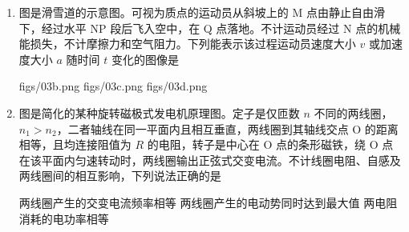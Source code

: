 \documentclass[\gkver]{gaokaozhenti}
\begin{document}
\begin{enumerate}
{B．根据 $\omega = \frac{2\pi}{T}$ 可知火星公转的角速度小于地球公转的角速度，故 B 错误；

D．根据 $G\frac{Mm}{r^{2}} = ma$ 可得 $a = \frac{GM}{r^{2}}$，可知火星公转的加速度小于地球公转的加速度，故 D 正确。

故选 D。
}

\item
图是滑雪道的示意图。可视为质点的运动员从斜坡上的 M 点由静止自由滑下，经过水平 NP 段后飞入空中，在 Q 点落地。不计运动员经过 N 点的机械能损失，不计摩擦力和空气阻力。下列能表示该过程运动员速度大小 $v$ 或加速度大小 $a$ 随时间 $t$ 变化的图像是


{figs/03b.png}
{figs/03c.png}
{figs/03d.png}


\item
图是简化的某种旋转磁极式发电机原理图。定子是仅匝数 $n$ 不同的两线圈，$n_{1} > n_{2}$，二者轴线在同一平面内且相互垂直，两线圈到其轴线交点 O 的距离相等，且均连接阻值为 $R$ 的电阻，转子是中心在 O 点的条形磁铁，绕 O 点在该平面内匀速转动时，两线圈输出正弦式交变电流。不计线圈电阻、自感及两线圈间的相互影响，下列说法正确的是


{两线圈产生的交变电流频率相等}
{两线圈产生的电动势同时达到最大值}
{两电阻消耗的电功率相等}


\end{enumerate}
\end{document}
